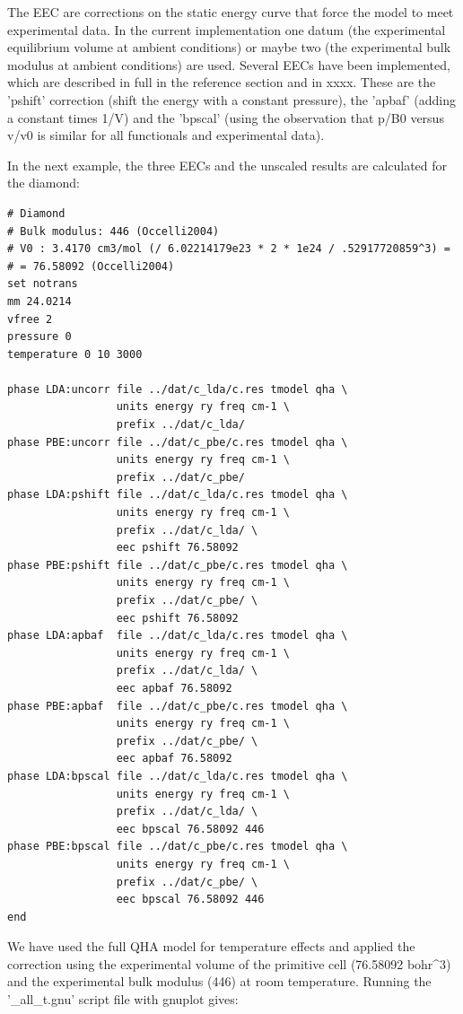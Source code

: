 \documentclass[a4paper]{article}
\begin{document}
The EEC are corrections on the static energy curve that force the
model to meet experimental data. In the current implementation one
datum (the experimental equilibrium volume at ambient conditions) or
maybe two (the experimental bulk modulus at ambient conditions) are
used. Several EECs have been implemented, which are described in full
in the reference section and in xxxx. These are the 'pshift'
correction (shift the energy with a constant pressure), the 'apbaf'
(adding a constant times 1/V) and the 'bpscal' (using the observation
that p/B0 versus v/v0 is similar for all functionals and experimental
data).

In the next example, the three EECs and the unscaled results are
calculated for the diamond:
%
\asciilist
\begin{lstlisting}
# Diamond
# Bulk modulus: 446 (Occelli2004)
# V0 : 3.4170 cm3/mol (/ 6.02214179e23 * 2 * 1e24 / .52917720859^3) =
# = 76.58092 (Occelli2004)
set notrans
mm 24.0214
vfree 2
pressure 0
temperature 0 10 3000

phase LDA:uncorr file ../dat/c_lda/c.res tmodel qha \
                 units energy ry freq cm-1 \
                 prefix ../dat/c_lda/
phase PBE:uncorr file ../dat/c_pbe/c.res tmodel qha \
                 units energy ry freq cm-1 \
                 prefix ../dat/c_pbe/
phase LDA:pshift file ../dat/c_lda/c.res tmodel qha \
                 units energy ry freq cm-1 \
                 prefix ../dat/c_lda/ \
                 eec pshift 76.58092
phase PBE:pshift file ../dat/c_pbe/c.res tmodel qha \
                 units energy ry freq cm-1 \
                 prefix ../dat/c_pbe/ \
                 eec pshift 76.58092
phase LDA:apbaf  file ../dat/c_lda/c.res tmodel qha \
                 units energy ry freq cm-1 \
                 prefix ../dat/c_lda/ \
                 eec apbaf 76.58092
phase PBE:apbaf  file ../dat/c_pbe/c.res tmodel qha \
                 units energy ry freq cm-1 \
                 prefix ../dat/c_pbe/ \
                 eec apbaf 76.58092
phase LDA:bpscal file ../dat/c_lda/c.res tmodel qha \
                 units energy ry freq cm-1 \
                 prefix ../dat/c_lda/ \
                 eec bpscal 76.58092 446
phase PBE:bpscal file ../dat/c_pbe/c.res tmodel qha \
                 units energy ry freq cm-1 \
                 prefix ../dat/c_pbe/ \
                 eec bpscal 76.58092 446
end
\end{lstlisting}

We have used the full QHA model for temperature effects and applied
the correction using the experimental volume of the primitive cell
(76.58092 bohr\textasciicircum{}3) and the experimental bulk modulus (446) at room
temperature. Running the '\_all\_t.gnu' script file with gnuplot gives:
\end{document}
